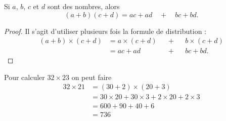 

\begin{propriete}
    Si \( a\), \( b\), \( c\) et \( d\) sont des nombres, alors
    \begin{equation}
        (a+b)(c+d)=ac+ad\quad+\quad bc+bd.
    \end{equation}
\end{propriete}

\begin{proof}
    Il s'agit d'utiliser plusieurs fois la formule de distribution :
    \begin{subequations}
        \begin{align}
            (a+b)\times \boxed{(c+d)}&=a\times \boxed{(c+d)}&&+&& b\times \boxed{(c+d)}\\
            &=ac+ad  &&+&&bc+bd.
        \end{align}
    \end{subequations}
\end{proof}

\begin{example}
    Pour calculer \( 32\times 23 \) on peut faire
    \begin{subequations}
        \begin{align}
                32\times 21&=(30+2)\times (20+3)\\
                &=30\times 20+30\times 3+2\times 20+2\times 3\\
                &=600+90+40+6\\
                &=736
        \end{align}
    \end{subequations}
\end{example}
